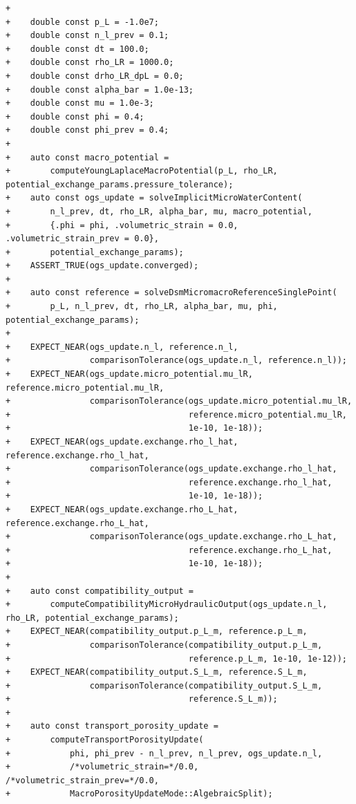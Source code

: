 \documentclass[10pt]{article}
\begin{document}
\begin{lstlisting}
+
+    double const p_L = -1.0e7;
+    double const n_l_prev = 0.1;
+    double const dt = 100.0;
+    double const rho_LR = 1000.0;
+    double const drho_LR_dpL = 0.0;
+    double const alpha_bar = 1.0e-13;
+    double const mu = 1.0e-3;
+    double const phi = 0.4;
+    double const phi_prev = 0.4;
+
+    auto const macro_potential =
+        computeYoungLaplaceMacroPotential(p_L, rho_LR, potential_exchange_params.pressure_tolerance);
+    auto const ogs_update = solveImplicitMicroWaterContent(
+        n_l_prev, dt, rho_LR, alpha_bar, mu, macro_potential,
+        {.phi = phi, .volumetric_strain = 0.0, .volumetric_strain_prev = 0.0},
+        potential_exchange_params);
+    ASSERT_TRUE(ogs_update.converged);
+
+    auto const reference = solveDsmMicromacroReferenceSinglePoint(
+        p_L, n_l_prev, dt, rho_LR, alpha_bar, mu, phi, potential_exchange_params);
+
+    EXPECT_NEAR(ogs_update.n_l, reference.n_l,
+                comparisonTolerance(ogs_update.n_l, reference.n_l));
+    EXPECT_NEAR(ogs_update.micro_potential.mu_lR, reference.micro_potential.mu_lR,
+                comparisonTolerance(ogs_update.micro_potential.mu_lR,
+                                    reference.micro_potential.mu_lR,
+                                    1e-10, 1e-18));
+    EXPECT_NEAR(ogs_update.exchange.rho_l_hat, reference.exchange.rho_l_hat,
+                comparisonTolerance(ogs_update.exchange.rho_l_hat,
+                                    reference.exchange.rho_l_hat,
+                                    1e-10, 1e-18));
+    EXPECT_NEAR(ogs_update.exchange.rho_L_hat, reference.exchange.rho_L_hat,
+                comparisonTolerance(ogs_update.exchange.rho_L_hat,
+                                    reference.exchange.rho_L_hat,
+                                    1e-10, 1e-18));
+
+    auto const compatibility_output =
+        computeCompatibilityMicroHydraulicOutput(ogs_update.n_l, rho_LR, potential_exchange_params);
+    EXPECT_NEAR(compatibility_output.p_L_m, reference.p_L_m,
+                comparisonTolerance(compatibility_output.p_L_m,
+                                    reference.p_L_m, 1e-10, 1e-12));
+    EXPECT_NEAR(compatibility_output.S_L_m, reference.S_L_m,
+                comparisonTolerance(compatibility_output.S_L_m,
+                                    reference.S_L_m));
+
+    auto const transport_porosity_update =
+        computeTransportPorosityUpdate(
+            phi, phi_prev - n_l_prev, n_l_prev, ogs_update.n_l,
+            /*volumetric_strain=*/0.0, /*volumetric_strain_prev=*/0.0,
+            MacroPorosityUpdateMode::AlgebraicSplit);

\end{lstlisting}
\end{document}
